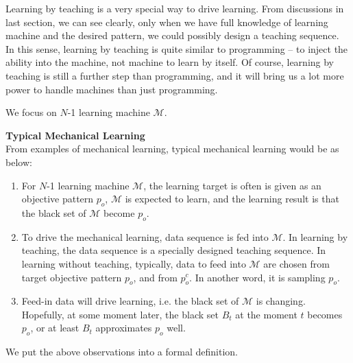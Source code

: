 Learning by teaching is a very special way to drive learning. From discussions in last section, we can see clearly,  only when we have full knowledge of learning machine and the desired pattern, we could possibly design a teaching sequence. In this sense, learning by teaching is quite similar to programming -- to inject the ability into the machine, not machine to learn by itself. Of course, learning by teaching is still a further step than programming, and it will bring us a lot more power to handle machines than just programming. 

We focus on $N$-1 learning machine $\mathcal{M}$. 

{\bf Typical Mechanical Learning } \\
From examples of mechanical learning, typical mechanical learning would be as below: 
\begin{enumerate} [topsep=0pt,itemsep=-1ex,partopsep=1ex,parsep=1ex]
\item For $N$-1 learning machine $\mathcal{M}$, the learning target is often is given as an objective pattern $p_o$, $\mathcal{M}$ is expected to learn, and the learning result is that the black set of $\mathcal{M}$ become $p_o$. 
\item To drive the mechanical learning, data sequence is fed into $\mathcal{M}$. In learning by teaching, the data sequence is a specially designed teaching sequence. In learning without teaching, typically, data to feed into $\mathcal{M}$ are chosen from target objective pattern $p_o$, and from $p_o^c$. In another word, it is sampling $p_o$.
\item Feed-in data will drive learning, i.e. the black set of $\mathcal{M}$ is changing. Hopefully, at some moment later, the black set $B_t$ at the moment $t$ becomes $p_o$, or at least $B_t$ approximates $p_o$ well. 
\end{enumerate}

We put the above observations into a formal definition. 


